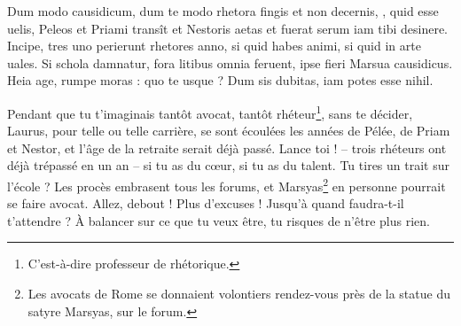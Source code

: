 \documentclass[12pt]{book}
\begin{document}
\begin{alignment}
    \begin{edition}
          Dum modo causidicum, dum te modo rhetora fingis 
          et non decernis, , quid esse uelis, 
          Peleos et Priami transît et Nestoris aetas 
          et fuerat serum iam tibi desinere. 
          Incipe, tres uno perierunt rhetores anno, 
          si quid habes animi, si quid in arte uales. 
          Si schola damnatur, fora litibus omnia feruent, 
          ipse  fieri Marsua causidicus. 
          Heia age, rumpe moras : quo te 
          usque ? 
          Dum  sis dubitas, iam potes esse nihil.   
    \end{edition}
    \begin{translation}
        Pendant que tu t'imaginais tantôt avocat, tantôt rhéteur\footnote{C'est-à-dire professeur de rhétorique.},
        sans te décider, Laurus, pour telle ou telle carrière, 
        se sont écoulées les années de Pélée, de Priam et Nestor, 
        et l'âge de la retraite serait déjà passé. 
        Lance toi ! – trois rhéteurs ont déjà trépassé en un an – 
        si tu as du c\oe ur, si tu as du talent. 
        Tu tires un trait sur l'école ? Les procès embrasent tous les forums, 
        et Marsyas\footnote{Les avocats de Rome se donnaient volontiers rendez-vous près de la statue du satyre Marsyas, sur le forum.} en personne pourrait se faire avocat. 
        Allez, debout ! Plus d'excuses ! Jusqu'à quand faudra-t-il t'attendre ? 
        À balancer sur ce que tu veux être, tu risques de n'être plus rien. 
    \end{translation}
  \end{alignment}
\end{document}
